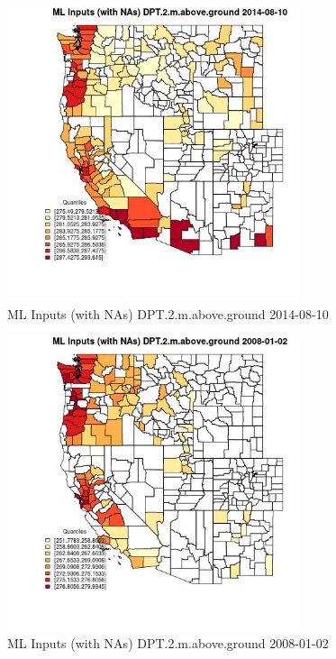 \begin{figure} 
\centering  
\includegraphics[width=0.77\textwidth]{Code_Outputs/Report_ML_input_PM25_Step4_part_e_de_duplicated_aves_compiled_2019-05-18wNAs_CountyDPT2mabovegroundMean2014-08-10_2014-08-10.jpg} 
\caption{\label{fig:Report_ML_input_PM25_Step4_part_e_de_duplicated_aves_compiled_2019-05-18wNAsCountyDPT2mabovegroundMean2014-08-10_2014-08-10}ML Inputs (with NAs) DPT.2.m.above.ground 2014-08-10} 
\end{figure} 
 

\begin{figure} 
\centering  
\includegraphics[width=0.77\textwidth]{Code_Outputs/Report_ML_input_PM25_Step4_part_e_de_duplicated_aves_compiled_2019-05-18wNAs_CountyDPT2mabovegroundMean2008-01-02_2008-01-02.jpg} 
\caption{\label{fig:Report_ML_input_PM25_Step4_part_e_de_duplicated_aves_compiled_2019-05-18wNAsCountyDPT2mabovegroundMean2008-01-02_2008-01-02}ML Inputs (with NAs) DPT.2.m.above.ground 2008-01-02} 
\end{figure} 
 

